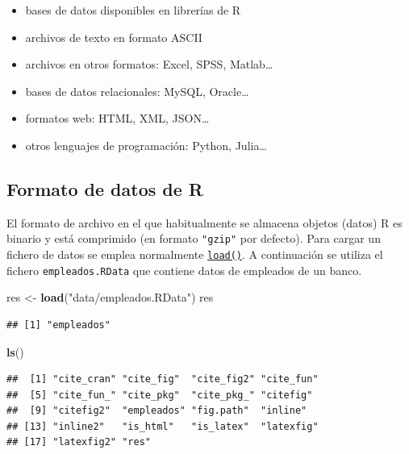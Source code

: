\documentclass[
]{book}
\newenvironment{Shaded}{\begin{snugshade}}{\end{snugshade}}
\newcommand{\FunctionTok}[1]{\textcolor[rgb]{0.13,0.29,0.53}{\textbf{#1}}}
\newcommand{\NormalTok}[1]{#1}
\newcommand{\OtherTok}[1]{\textcolor[rgb]{0.56,0.35,0.01}{#1}}
\newcommand{\StringTok}[1]{\textcolor[rgb]{0.31,0.60,0.02}{#1}}
\theoremstyle{break}
\theoremstyle{nonumberplain}
\begin{document}
\begin{itemize}
\item
  bases de datos disponibles en librerías de R
\item
  archivos de texto en formato ASCII
\item
  archivos en otros formatos: Excel, SPSS, Matlab\ldots{}
\item
  bases de datos relacionales: MySQL, Oracle\ldots{}
\item
  formatos web: HTML, XML, JSON\ldots{}
\item
  otros lenguajes de programación: Python, Julia\ldots{}
\end{itemize}

\subsection{Formato de datos de R}\label{formato-de-datos-de-r}

El formato de archivo en el que habitualmente se almacena objetos (datos)
R es binario y está comprimido (en formato \texttt{"gzip"} por defecto).
Para cargar un fichero de datos se emplea normalmente \href{https://www.rdocumentation.org/packages/base/versions/3.6.1/topics/load}{\texttt{load()}}.
A continuación se utiliza el fichero \texttt{empleados.RData} que contiene datos de empleados de un banco.

\begin{Shaded}
\begin{Highlighting}[]
\NormalTok{res }\OtherTok{\textless{}{-}} \FunctionTok{load}\NormalTok{(}\StringTok{"data/empleados.RData"}\NormalTok{)}
\NormalTok{res}
\end{Highlighting}
\end{Shaded}

\begin{verbatim}
## [1] "empleados"
\end{verbatim}

\begin{Shaded}
\begin{Highlighting}[]
\FunctionTok{ls}\NormalTok{()}
\end{Highlighting}
\end{Shaded}

\begin{verbatim}
##  [1] "cite_cran" "cite_fig"  "cite_fig2" "cite_fun" 
##  [5] "cite_fun_" "cite_pkg"  "cite_pkg_" "citefig"  
##  [9] "citefig2"  "empleados" "fig.path"  "inline"   
## [13] "inline2"   "is_html"   "is_latex"  "latexfig" 
## [17] "latexfig2" "res"
\end{verbatim}
\end{document}
